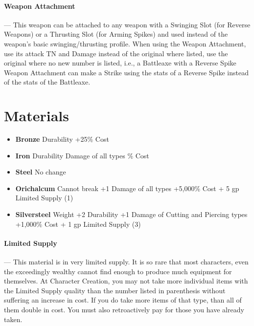 \documentclass[oneside,11pt,english]{book}
\begin{document}
\vspace{-5pt}\paragraph{\label{wepqual:Weapon Attachment}Weapon Attachment}---\quad
This weapon can be attached to any weapon with a Swinging Slot (for Reverse
Weapons) or a Thrusting Slot (for Arming Spikes) and used instead of the
weapon’s basic swinging/thrusting profile. When using the Weapon Attachment, use
its attack TN and Damage instead of the original where listed, use the original
where no new number is listed, i.e., a Battleaxe with a Reverse Spike Weapon
Attachment can make a Strike using the stats of a Reverse Spike instead of the
stats of the Battleaxe. 

\section{Materials}
\begin{itemize}
\item [] \textbf{Bronze}
   Durability
  \subitem +25\% Cost
\end{itemize}
\begin{itemize}
\item [] \textbf{Iron}
   Durability
   Damage of all types
  \% Cost
\end{itemize}

\begin{itemize}
\item [] \textbf{Steel}
  \subitem No change
\end{itemize}
\begin{itemize}
\item [] \textbf{Orichalcum}
  \subitem Cannot break
  \subitem +1 Damage of all types
  \subitem +5,000\% Cost + 5 gp
  \subitem Limited Supply (1)
\end{itemize}
\begin{itemize}
\item [] \textbf{Silversteel}
   Weight
  \subitem +2 Durability
  \subitem +1 Damage of Cutting and Piercing types
  \subitem +1,000\% Cost + 1 gp
  \subitem Limited Supply (3)
\end{itemize}
\paragraph{Limited Supply}--- \quad
This material is in very limited supply. It is so rare that most characters,
even the exceedingly wealthy cannot find enough to produce much equipment for
themselves. At Character Creation, you may not take more individual items with
the Limited Supply quality than the number listed in parenthesis without
suffering an increase in cost. If you do take more items of that type, than all
of them double in cost. You must also retroactively pay for those you have
already taken. 
\end{document}
